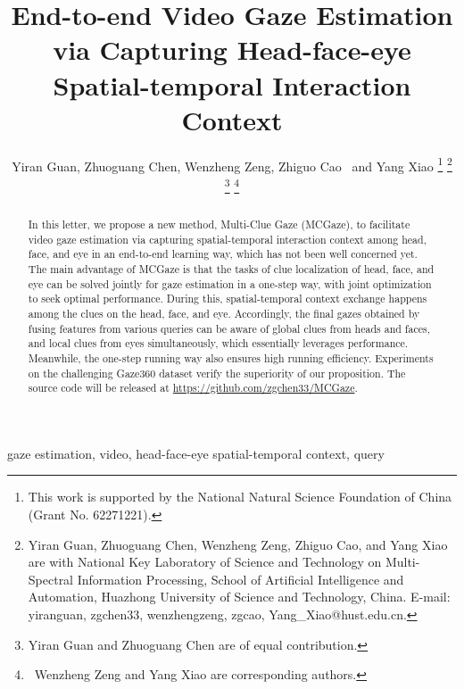\documentclass[journal]{IEEEtran}
\begin{document}
\title{End-to-end Video Gaze Estimation via Capturing Head-face-eye Spatial-temporal Interaction Context }

\author{Yiran Guan, Zhuoguang Chen, Wenzheng Zeng\dag, Zhiguo Cao~ and Yang Xiao\dag  
\thanks{This work is supported by the National Natural Science Foundation of China (Grant No. 62271221). }
\thanks{Yiran Guan, Zhuoguang Chen, Wenzheng Zeng, Zhiguo Cao, and Yang Xiao are with National Key Laboratory of Science and Technology on Multi-Spectral Information Processing, School of Artificial Intelligence and Automation, Huazhong University of Science and Technology, China. E-mail: yiranguan, zgchen33, wenzhengzeng, zgcao, Yang\_Xiao@hust.edu.cn. }
\thanks{ Yiran Guan and Zhuoguang Chen are of equal contribution.}
\thanks{\dag~Wenzheng Zeng and Yang Xiao are corresponding authors.}
}


\maketitle
\begin{abstract}
 In this letter, we propose a new method, Multi-Clue Gaze (MCGaze), to facilitate video gaze estimation via capturing spatial-temporal interaction context among head, face, and eye in an end-to-end learning way, which has not been well concerned yet. The main advantage of MCGaze is that the tasks of clue localization of head, face, and eye can be solved jointly for gaze estimation in a one-step way, with joint optimization to seek optimal performance. During this, spatial-temporal context exchange happens among the clues on the head, face, and eye. Accordingly, the final gazes obtained by fusing features from various queries can be aware of global clues from heads and faces, and local clues from eyes simultaneously, which essentially leverages performance. Meanwhile, the one-step running way also ensures high running efficiency. Experiments on the challenging Gaze360 dataset verify the superiority of our proposition. The source code will be released at \url{https://github.com/zgchen33/MCGaze}.


\end{abstract}

\begin{IEEEkeywords}
gaze estimation, video, head-face-eye spatial-temporal context, query\end{IEEEkeywords}


\IEEEpeerreviewmaketitle
\end{document}
